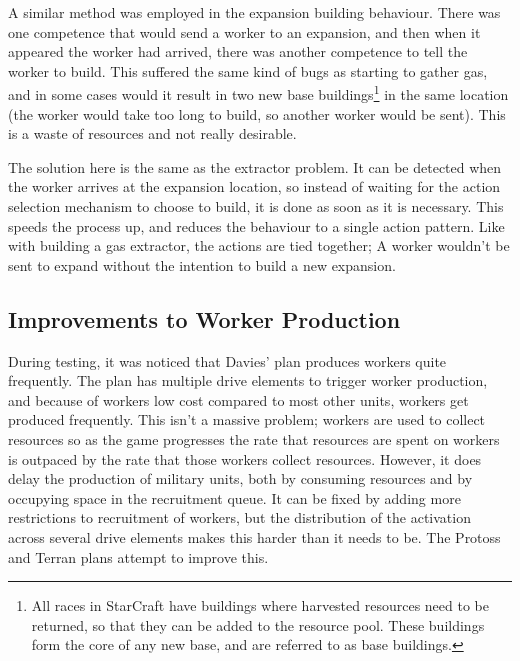 \documentclass[11pt,openright,a4paper]{report}
\begin{document}
A similar method was employed in the expansion building behaviour. There was one competence that would send a worker to an expansion, and then when it appeared the worker had arrived, there was another competence to tell the worker to build. This suffered the same kind of bugs as starting to gather gas, and in some cases would it result in two new base buildings\footnote{All races in StarCraft have buildings where harvested resources need to be returned, so that they can be added to the resource pool. These buildings form the core of any new base, and are referred to as base buildings.} in the same location (the worker would take too long to build, so another worker would be sent). This is a waste of resources and not really desirable.

The solution here is the same as the extractor problem. It can be detected when the worker arrives at the expansion location, so instead of waiting for the action selection mechanism to choose to build, it is done as soon as it is necessary. This speeds the process up, and reduces the behaviour to a single action pattern. Like with building a gas extractor, the actions are tied together; A worker wouldn't be sent to expand without the intention to build a new expansion.

\subsection{Improvements to Worker Production}
\label{workerProd}
During testing, it was noticed that Davies' plan produces workers quite frequently. The plan has multiple drive elements to trigger worker production, and because of workers low cost compared to most other units, workers get produced frequently. This isn't a massive problem; workers are used to collect resources so as the game progresses the rate that resources are spent on workers is outpaced by the rate that those workers collect resources. However, it does delay the production of military units, both by consuming resources and by occupying space in the recruitment queue. It can be fixed by adding more restrictions to recruitment of workers, but the distribution of the activation across several drive elements makes this harder than it needs to be. The Protoss and Terran plans attempt to improve this.
\end{document}
